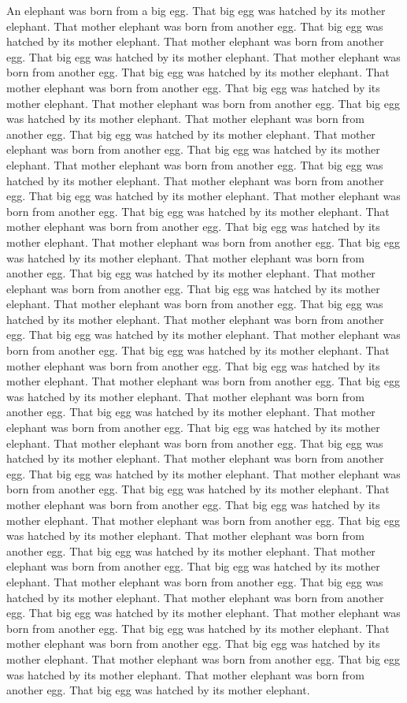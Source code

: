 An elephant was born from a big egg.
That big egg was hatched by its mother elephant.
That mother elephant was born from another egg.
That big egg was hatched by its mother elephant.
That mother elephant was born from another egg.
That big egg was hatched by its mother elephant.
That mother elephant was born from another egg.
That big egg was hatched by its mother elephant.
That mother elephant was born from another egg.
That big egg was hatched by its mother elephant.
That mother elephant was born from another egg.
That big egg was hatched by its mother elephant.
That mother elephant was born from another egg.
That big egg was hatched by its mother elephant.
That mother elephant was born from another egg.
That big egg was hatched by its mother elephant.
That mother elephant was born from another egg.
That big egg was hatched by its mother elephant.
That mother elephant was born from another egg.
That big egg was hatched by its mother elephant.
That mother elephant was born from another egg.
That big egg was hatched by its mother elephant.
That mother elephant was born from another egg.
That big egg was hatched by its mother elephant.
That mother elephant was born from another egg.
That big egg was hatched by its mother elephant.
That mother elephant was born from another egg.
That big egg was hatched by its mother elephant.
That mother elephant was born from another egg.
That big egg was hatched by its mother elephant.
That mother elephant was born from another egg.
That big egg was hatched by its mother elephant.
That mother elephant was born from another egg.
That big egg was hatched by its mother elephant.
That mother elephant was born from another egg.
That big egg was hatched by its mother elephant.
That mother elephant was born from another egg.
That big egg was hatched by its mother elephant.
That mother elephant was born from another egg.
That big egg was hatched by its mother elephant.
That mother elephant was born from another egg.
That big egg was hatched by its mother elephant.
That mother elephant was born from another egg.
That big egg was hatched by its mother elephant.
That mother elephant was born from another egg.
That big egg was hatched by its mother elephant.
That mother elephant was born from another egg.
That big egg was hatched by its mother elephant.
That mother elephant was born from another egg.
That big egg was hatched by its mother elephant.
That mother elephant was born from another egg.
That big egg was hatched by its mother elephant.
That mother elephant was born from another egg.
That big egg was hatched by its mother elephant.
That mother elephant was born from another egg.
That big egg was hatched by its mother elephant.
That mother elephant was born from another egg.
That big egg was hatched by its mother elephant.
That mother elephant was born from another egg.
That big egg was hatched by its mother elephant.
That mother elephant was born from another egg.
That big egg was hatched by its mother elephant.
That mother elephant was born from another egg.
That big egg was hatched by its mother elephant.
That mother elephant was born from another egg.
That big egg was hatched by its mother elephant.
That mother elephant was born from another egg.
That big egg was hatched by its mother elephant.
That mother elephant was born from another egg.
That big egg was hatched by its mother elephant.

